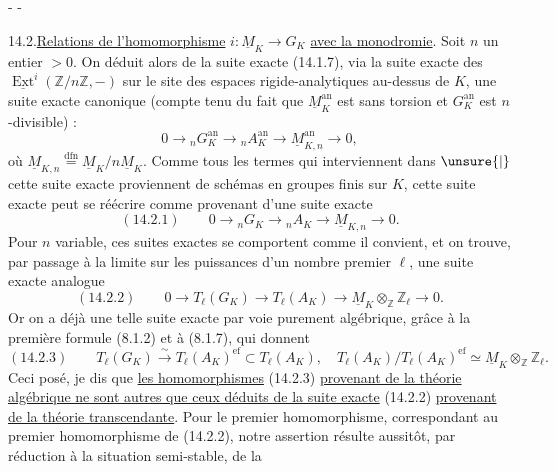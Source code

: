 \begin{center}-  -\end{center}
14.2.\quad\uline{Relations de l'homomorphisme} $i:\underline M_K\longrightarrow G_K$
\uline{avec la monodromie}. Soit $n$ un entier $>0$. On déduit alors de la suite exacte (14.1.7), via la
suite exacte des $\underline{\operatorname{Ext}}^i(\mathbb Z/n\mathbb Z,-)$ sur le site des espaces rigide-analytiques
au-dessus de $K$, une suite exacte canonique (compte tenu du fait que
$\underline M_K^{\mathrm{an}}$ est sans torsion et $G_K^{\mathrm{an}}$ est $n$-divisible) :
\[
0\longrightarrow{}_nG_K^{\mathrm{an}}\longrightarrow{}_nA_K^{\mathrm{an}}
\longrightarrow\underline M_{K,n}^{\mathrm{an}}\longrightarrow0,
\]
où $\underline M_{K,n}\overset{\mathrm{dfn}}=\underline M_K/n\underline M_K$.
Comme tous les termes qui interviennent dans $\unsure{\vert}$ cette suite exacte proviennent de schémas en groupes finis sur $K$,
cette suite exacte peut se réécrire comme provenant d'une suite exacte
\[
(14.2.1)\qquad0\longrightarrow{}_nG_K\longrightarrow{}_nA_K
\longrightarrow\underline M_{K,n}\longrightarrow0.
\]
Pour $n$ variable, ces suites exactes se comportent comme il convient,
et on trouve, par passage à la limite sur les puissances d'un nombre premier $\ell$, une suite exacte analogue
\[
(14.2.2)\qquad0\longrightarrow T_\ell(G_K)\longrightarrow T_\ell(A_K)
\longrightarrow\underline M_K\otimes_{\mathbb Z}\mathbb Z_\ell\longrightarrow0.
\]
Or on a déjà une telle suite exacte par voie purement algébrique, grâce
à la première formule (8.1.2) et à (8.1.7), qui donnent
\[
(14.2.3)\qquad T_\ell(G_K)\xrightarrow{\sim}T_\ell(A_K)^{\mathrm{ef}}\subset T_\ell(A_K),
\quad T_\ell(A_K)/T_\ell(A_K)^{\mathrm{ef}}\simeq\underline M_K\otimes_{\mathbb Z}\mathbb Z_\ell.
\]
Ceci posé, je dis que \uline{les homomorphismes} (14.2.3)
\uline{provenant de la théorie algébrique ne sont autres que ceux déduits de la suite exacte} (14.2.2)
\uline{provenant de la théorie transcendante}. Pour le premier homomorphisme,
correspondant au premier homomorphisme de (14.2.2), notre assertion
résulte aussitôt, par réduction à la situation semi-stable, de la
